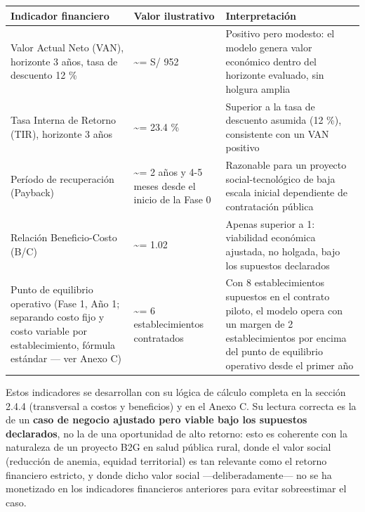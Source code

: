 \documentclass[11pt,a4paper]{article}
\begin{document}
{\small
\begin{longtable}[]{@{}
  >{\raggedright\arraybackslash}p{}
  >{\raggedright\arraybackslash}p{}
  >{\raggedright\arraybackslash}p{}@{}}
\toprule\noalign{}
\begin{minipage}[b]{\linewidth}\raggedright
Indicador financiero
\end{minipage} & \begin{minipage}[b]{\linewidth}\raggedright
Valor ilustrativo
\end{minipage} & \begin{minipage}[b]{\linewidth}\raggedright
Interpretación
\end{minipage} \\
\midrule\noalign{}
\endhead
\bottomrule\noalign{}
\endlastfoot
Valor Actual Neto (VAN), horizonte 3 años, tasa de descuento 12 \% & \textasciitilde= S/ 952 & Positivo pero modesto: el modelo genera valor económico dentro del horizonte evaluado, sin holgura amplia \\
Tasa Interna de Retorno (TIR), horizonte 3 años & \textasciitilde= 23.4 \% & Superior a la tasa de descuento asumida (12 \%), consistente con un VAN positivo \\
Período de recuperación (Payback) & \textasciitilde= 2 años y 4-5 meses desde el inicio de la Fase 0 & Razonable para un proyecto social-tecnológico de baja escala inicial dependiente de contratación pública \\
Relación Beneficio-Costo (B/C) & \textasciitilde= 1.02 & Apenas superior a 1: viabilidad económica ajustada, no holgada, bajo los supuestos declarados \\
Punto de equilibrio operativo (Fase 1, Año 1; separando costo fijo y costo variable por establecimiento, fórmula estándar --- ver Anexo C) & \textasciitilde= 6 establecimientos contratados & Con 8 establecimientos supuestos en el contrato piloto, el modelo opera con un margen de 2 establecimientos por encima del punto de equilibrio operativo desde el primer año \\
\end{longtable}
}

Estos indicadores se desarrollan con su lógica de cálculo completa en la sección 2.4.4 (transversal a costos y beneficios) y en el Anexo C. Su lectura correcta es la de un \textbf{caso de negocio ajustado pero viable bajo los supuestos declarados}, no la de una oportunidad de alto retorno: esto es coherente con la naturaleza de un proyecto B2G en salud pública rural, donde el valor social (reducción de anemia, equidad territorial) es tan relevante como el retorno financiero estricto, y donde dicho valor social ---deliberadamente--- no se ha monetizado en los indicadores financieros anteriores para evitar sobreestimar el caso.
\end{document}

